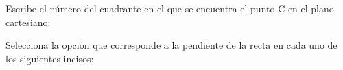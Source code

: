 \documentclass[12pt,addpoints]{evalua}
\begin{document}
\begin{questions}
      \question[2] Escribe el número del cuadrante en el que se encuentra el punto C en el plano cartesiano: \fillin[4 cuad.][1in]

      \newpage
      \question[8] Selecciona la opcion que corresponde a la pendiente de la recta en cada uno de los siguientes incisos:
    
      \begin{multicols}{2}
\end{multicols}
\end{questions}
\end{document}
